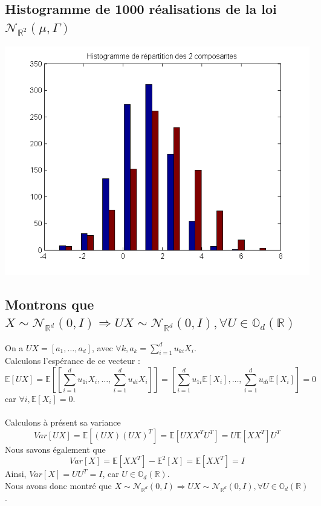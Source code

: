 \documentclass{report}
\begin{document}
		\subsection{Histogramme de 1000 réalisations de la loi $\mathcal{N}_{\mathbb{R}^2}(\mu, \Gamma)$}
			\includegraphics[scale=0.7]{sources/Q222-2.png}
		\subsection{Montrons que $X \sim \mathcal{N}_{\mathbb{R}^d}(0, I) \Rightarrow UX \sim \mathcal{N}_{\mathbb{R}^d}(0, I), \forall U \in \mathbb{O}_d(\mathbb{R})$}
			On a $UX = [a_1, \ldots, a_d]$, avec $\forall k, a_k = \sum\limits_{i=1}^d u_{ki}X_i$.\\
			Calculons l'espérance de ce vecteur : 
			\[ \mathbb{E}[UX] = \mathbb{E}\left[ [\sum\limits_{i=1}^d u_{1i}X_i, \ldots, \sum\limits_{i=1}^d u_{di}X_i]\right] = \left[ \sum\limits_{i=1}^d u_{1i}\mathbb{E}[X_i], \ldots, \sum\limits_{i=1}^d u_{di}\mathbb{E}[X_i]\right] = 0\]car $\forall i, \mathbb{E}[X_i] = 0$.\\
			\\
			Calculons à présent sa variance
			\[ Var[UX] = \mathbb{E}[(UX)(UX)^T] = \mathbb{E}[U X X^T U^T] = U \mathbb{E}[XX^T]U^T \]
			Nous savons également que
			\[ Var[X] = \mathbb{E}[X X^T] - \mathbb{E}^2[X] = \mathbb{E}[X X^T] = I \]
			Ainsi, $Var[X] = UU^T = I$, car $U \in \mathbb{O}_d(\mathbb{R})$.\\
			Nous avons donc montré que $X \sim \mathcal{N}_{\mathbb{R}^d}(0, I) \Rightarrow UX \sim \mathcal{N}_{\mathbb{R}^d}(0, I), \forall U \in \mathbb{O}_d(\mathbb{R})$.
\end{document}

